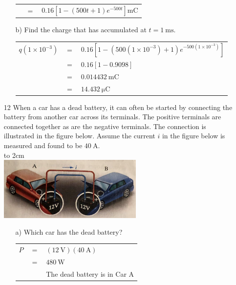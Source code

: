 \documentclass[a4paper]{article}
\begin{document}
\begin{itemize}
\begin{itemize}
\begin{tabular}{r c l}
		      	       & $=$ & $0.16[1-(500t + 1)e^{-500t}]\si{\milli\coulomb}$                                      \\
		      \end{tabular}
		\item[b)] Find the charge that has accumulated at $t = \SI{1}{\ms}$. \\
		      \begin{tabular}{r c l}
		      	$q(1\times10^{-3})$ & $=$ & $0.16[1-(500(1\times10^{-3}) + 1)e^{-500(1\times10^{-3})}]$ \\
		      	                    & $=$ & $0.16[1 - 0.9098]$                                          \\
		      	                    & $=$ & $\SI{0.014432}{\milli\coulomb}$                             \\  
		      	                    & $=$ & $\SI{14.432}{\micro\coulomb}$                               \\
		      \end{tabular}
	\end{itemize}
	\item[12] When a car has a dead battery, it can often be started by connecting the battery from another car across its terminals. The positive terminals are connected together as are the negative terminals. The connection is illustrated in the figure below. Assume the current $i$ in the figure below is measured and found to be $\SI{40}{\ampere}$. \\
	      \hbox to 2cm{} \\
	      \includegraphics{P1-12.png} \\
	      \begin{itemize}
	      	\item[a)] Which car has the dead battery? \\
	      	      \begin{tabular}{r c l}
	      	      	$P$ & $=$ & $(\SI{12}{\volt})(\SI{40}{\ampere})$ \\
	      	      	    & $=$ & $\SI{480}{\watt}$                    \\
	      	      	    &     & The dead battery is in Car A         \\

\end{tabular}
\end{itemize}
\end{itemize}
\end{document}
